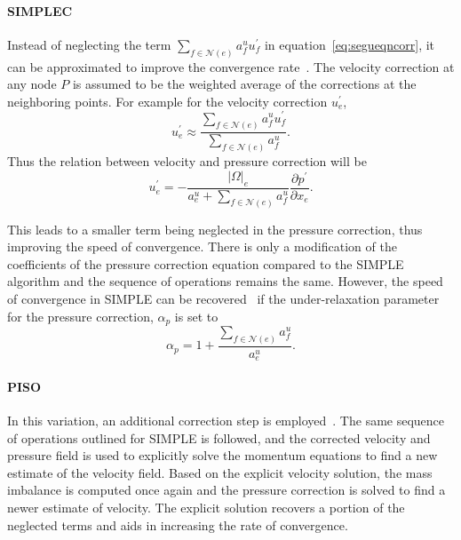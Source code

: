\paragraph{SIMPLEC}
Instead of neglecting the term $\sum_{f \in\mathcal{N}(e)} a_f^u u_f^{\prime}$ in equation~\ref{eq:segueqncorr}, it can be approximated to improve the convergence rate~\cite{simplerref}. The velocity correction at any node $P$ is assumed to be the weighted average of the corrections at the neighboring points. For example for the velocity correction $u_e^{\prime}$,
\begin{equation}
u_e^{\prime} \approx \frac{\sum_{f\in\mathcal{N}(e)}a^u_f u^{\prime}_f}{\sum_{f\in\mathcal{N}(e)}a^u_f}.
\end{equation}
Thus the relation between velocity and pressure correction will be 
\begin{equation}
u_e^{\prime} = -\frac{|\Omega|_e}{a_e^u + \sum_{f\in\mathcal{N}(e)}a^u_f}\frac{\partial p^{\prime}}{\partial x_e}.
\label{eq:simplecstageqn}
\end{equation}

This leads to a smaller term being neglected in the pressure correction, thus improving the speed of convergence. There is only a modification of the coefficients of the pressure correction equation compared to the SIMPLE algorithm and the sequence of operations remains the same. However, the speed of convergence in SIMPLE can be recovered~\cite{Ferziger2002} if the under-relaxation parameter for the pressure correction, $\alpha_p$ is set to
\begin{equation}
\alpha_p = 1+\frac{\sum_{f \in\mathcal{N}(e)} a_f^u}{a_e^u}.
\end{equation}

\paragraph{PISO}
In this variation, an additional correction step is employed~\cite{pisoref}. The same sequence of operations outlined for SIMPLE is followed, and the corrected velocity and pressure field is used to explicitly solve the momentum equations to find a new estimate of the velocity field. Based on the explicit velocity solution, the mass imbalance is computed once again and the pressure correction is solved to find a newer estimate of velocity. The explicit solution recovers a portion of the neglected terms and aids in increasing the rate of convergence. 

